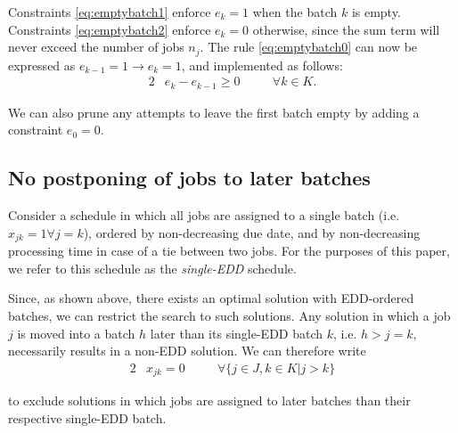\documentclass[13pt, letterpaper, oneside]{book}
\begin{document}
Constraints \eqref{eq:emptybatch1} enforce $e_k = 1$ when the batch $k$ is
empty. Constraints \eqref{eq:emptybatch2} enforce $e_k = 0$ otherwise, since the
sum term will never exceed the number of jobs $n_j$. The rule \eqref{eq:emptybatch0} can now be
expressed as $e_{k-1} = 1 \rightarrow e_k = 1$, and implemented as follows:
\begin{alignat}{2}
& e_k - e_{k-1} \geq 0 \quad && \forall k \in K.
\end{alignat}

We can also prune any attempts to leave the first batch empty by adding a constraint $e_0 = 0$.

\subsection{No postponing of jobs to later batches}
\label{sec:nopostponing}
Consider a schedule in which all jobs are assigned to a single batch (i.e.
$x_{jk} = 1 \forall j = k$), ordered by non-decreasing due date, and by
non-decreasing processing time in case of a tie between two jobs. For the
purposes of this paper, we refer to this schedule as the \textit{single-EDD}
schedule. 

Since, as shown above, there exists an optimal solution with EDD-ordered
batches, we can restrict the search to such solutions. Any solution in which
a job $j$ is moved into a batch $h$ later than its single-EDD batch $k$, i.e. $h
> j = k$, necessarily results in a non-EDD solution. We can therefore write
\begin{alignat}{2}
  & x_{jk} = 0 \quad && \forall \{j \in J, k \in K | j > k \} \label{eq:mipnopp}
\end{alignat}

to exclude solutions in which jobs are assigned to later batches than their
respective single-EDD batch.
\end{document}
